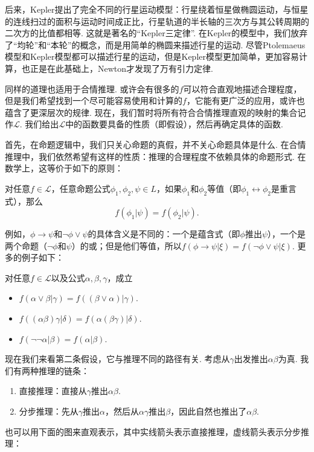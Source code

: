 后来，Kepler提出了完全不同的行星运动模型：行星绕着恒星做椭圆运动，与恒星的连线扫过的面积与运动时间成正比，行星轨道的半长轴的三次方与其公转周期的二次方的比值都相等. 这就是著名的“Kepler三定律”. 在Kepler的模型中，我们放弃了“均轮”和“本轮”的概念，而是用简单的椭圆来描述行星的运动. 尽管Ptolemaeus模型和Kepler模型都可以描述行星的运动，但是Kepler模型更加简单，更加容易计算，也正是在此基础上，Newton才发现了万有引力定律. 

同样的道理也适用于合情推理. 或许会有很多的$f$可以符合直观地描述合理程度，但是我们希望找到一个尽可能容易使用和计算的$f$，它能有更广泛的应用，或许也蕴含了更深层次的规律. 现在，我们暂时将所有符合合情推理直观的映射的集合记作$\mathcal L$. 我们给出$\mathcal L$中的函数要具备的性质（即假设），然后再确定具体的函数. 

首先，在命题逻辑中，我们只关心命题的真假，并不关心命题具体是什么. 在合情推理中，我们依然希望有这样的性质：推理的合理程度不依赖具体的命题形式. 在数学上，这等价于如下的原则：

\begin{principle}[等值原则]
    对任意$f\in\mathcal L$，任意命题公式$\phi_1,\phi_2,\psi\in L$，如果$\phi_1$和$\phi_2$等值（即$\phi_1\leftrightarrow\phi_2$是重言式），那么
    \[
        f(\phi_1|\psi)=f(\phi_2|\psi).
    \]
\end{principle}

例如，$\phi\to \psi$和$\neg \phi\vee \psi$的具体含义是不同的：一个是蕴含式（即$\phi$推出$\psi$），一个是两个命题（$\neg \phi$和$\psi$）的或；但是他们等值，所以$f(\phi\to \psi | \xi)=f(\neg \phi\vee \psi|\xi)$. 更多的例子如下：

\begin{example}
    对任意$f\in\mathcal L$以及公式$\alpha,\beta,\gamma$，成立
    \begin{itemize}
        \item $f(\alpha\vee \beta | \gamma)=f((\beta\vee \alpha) | \gamma)$.
        \item $f((\alpha\beta)\gamma|\delta)=f(\alpha(\beta\gamma)|\delta)$.
        \item $f(\neg\neg \alpha|\beta)=f(\alpha|\beta)$.
    \end{itemize}
\end{example}

现在我们来看第二条假设，它与推理不同的路径有关. 考虑从$\gamma$出发推出$\alpha\beta$为真. 我们有两种推理的链条：
\begin{enumerate}
    \item 直接推理：直接从$\gamma$推出$\alpha\beta$.
    \item 分步推理：先从$\gamma$推出$\alpha$，然后从$\alpha\gamma$推出$\beta$，因此自然也推出了$\alpha\beta$.
\end{enumerate}
也可以用下面的图来直观表示，其中实线箭头表示直接推理，虚线箭头表示分步推理：

